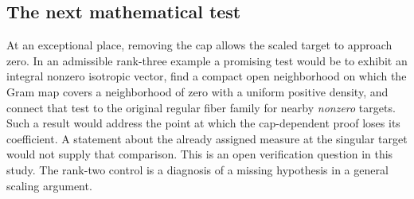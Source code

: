 \documentclass[12pt,letterpaper]{article}
\begin{document}
\subsection{The next mathematical test}
At an exceptional place, removing the cap allows the scaled target to approach zero. In an admissible rank-three example a promising test would be to exhibit an integral nonzero isotropic vector, find a compact open neighborhood on which the Gram map covers a neighborhood of zero with a uniform positive density, and connect that test to the original regular fiber family for nearby \emph{nonzero} targets. Such a result would address the point at which the cap-dependent proof loses its coefficient. A statement about the already assigned measure at the singular target would not supply that comparison. This is an open verification question in this study. The rank-two control is a diagnosis of a missing hypothesis in a general scaling argument.
\end{document}
